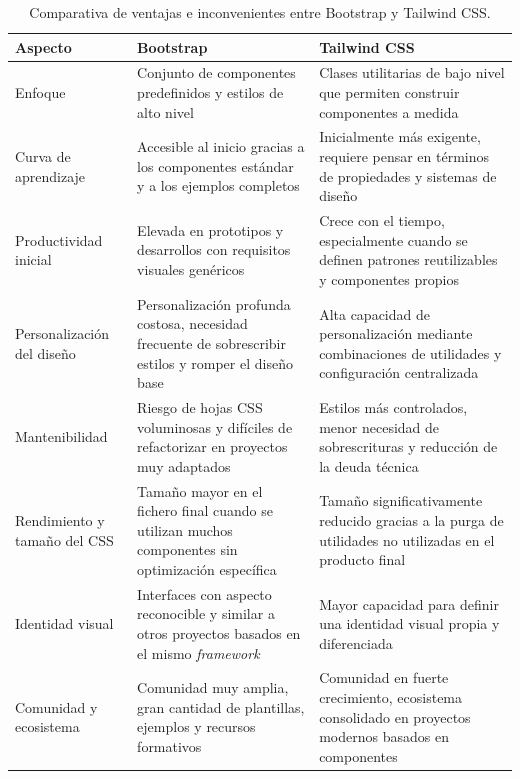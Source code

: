 \begin{table}[h]
	\centering
	\renewcommand{\arraystretch}{1.3}
	\begin{tabular}{p{}p{}p{}}
		\toprule
		\textbf{Aspecto} & \textbf{Bootstrap} & \textbf{Tailwind CSS} \\
		\midrule
		Enfoque & Conjunto de componentes predefinidos y estilos de alto nivel &
		Clases utilitarias de bajo nivel que permiten construir componentes a medida \\
		Curva de aprendizaje & Accesible al inicio gracias a los componentes estándar y a los ejemplos completos &
		Inicialmente más exigente, requiere pensar en términos de propiedades y sistemas de diseño \\
		Productividad inicial & Elevada en prototipos y desarrollos con requisitos visuales genéricos &
		Crece con el tiempo, especialmente cuando se definen patrones reutilizables y componentes propios \\
		Personalización del diseño & Personalización profunda costosa, necesidad frecuente de sobrescribir estilos y romper el diseño base &
		Alta capacidad de personalización mediante combinaciones de utilidades y configuración centralizada \\
		Mantenibilidad & Riesgo de hojas CSS voluminosas y difíciles de refactorizar en proyectos muy adaptados &
		Estilos más controlados, menor necesidad de sobrescrituras y reducción de la deuda técnica \\
		Rendimiento y tamaño del CSS & Tamaño mayor en el fichero final cuando se utilizan muchos componentes sin optimización específica &
		Tamaño significativamente reducido gracias a la purga de utilidades no utilizadas en el producto final \\
		Identidad visual & Interfaces con aspecto reconocible y similar a otros proyectos basados en el mismo \textit{framework} &
		Mayor capacidad para definir una identidad visual propia y diferenciada \\
		Comunidad y ecosistema & Comunidad muy amplia, gran cantidad de plantillas, ejemplos y recursos formativos &
		Comunidad en fuerte crecimiento, ecosistema consolidado en proyectos modernos basados en componentes \\
		\bottomrule
	\end{tabular}
	\caption[Comparativa de Bootstrap y Tailwind]{Comparativa de ventajas e inconvenientes entre Bootstrap y Tailwind CSS.}
	\label{tab:bootstrap_tailwind}
\end{table}


